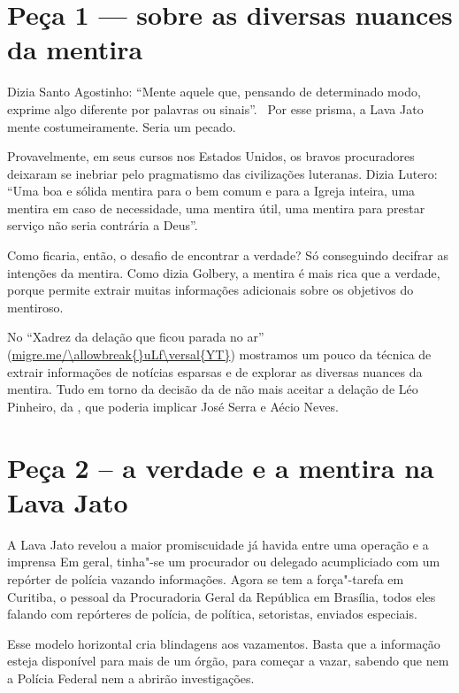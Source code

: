  

\section{Peça 1 --- sobre as diversas nuances da mentira}

Dizia Santo Agostinho: ``Mente aquele que, pensando de determinado modo,
exprime algo diferente por palavras ou sinais''. ~Por esse prisma, a
Lava Jato mente costumeiramente. Seria um pecado.

Provavelmente, em seus cursos nos Estados Unidos, os bravos procuradores
deixaram se inebriar pelo pragmatismo das civilizações luteranas. Dizia
Lutero: ``Uma boa e sólida mentira para o bem comum e para a Igreja
inteira, uma mentira em caso de necessidade, uma mentira útil, uma
mentira para prestar serviço não seria contrária a Deus''.

Como ficaria, então, o desafio de encontrar a verdade? Só conseguindo
decifrar as intenções da mentira. Como dizia Golbery, a mentira é mais
rica que a verdade, porque permite extrair muitas informações adicionais
sobre os objetivos do mentiroso.

No ``Xadrez da delação que ficou parada no ar''
(\url{migre.me/\allowbreak{}uLf\versal{YT}}) mostramos um pouco da técnica de extrair
informações de notícias esparsas e de explorar as diversas nuances da
mentira. Tudo em torno da decisão da  de não mais aceitar a delação
de Léo Pinheiro, da , que poderia implicar José Serra e Aécio Neves.

\section{Peça 2 -- a verdade e a mentira na Lava Jato}

A Lava Jato revelou a maior promiscuidade já havida entre uma operação e
a imprensa Em geral, tinha"-se um procurador ou delegado acumpliciado com
um repórter de polícia vazando informações. Agora se tem a força"-tarefa
em Curitiba, o pessoal da Procuradoria Geral da República em Brasília,
todos eles falando com repórteres de polícia, de política, setoristas,
enviados especiais.

Esse modelo horizontal cria blindagens aos vazamentos. Basta que a
informação esteja disponível para mais de um órgão, para começar a
vazar, sabendo que nem a Polícia Federal nem a  abrirão
investigações.

